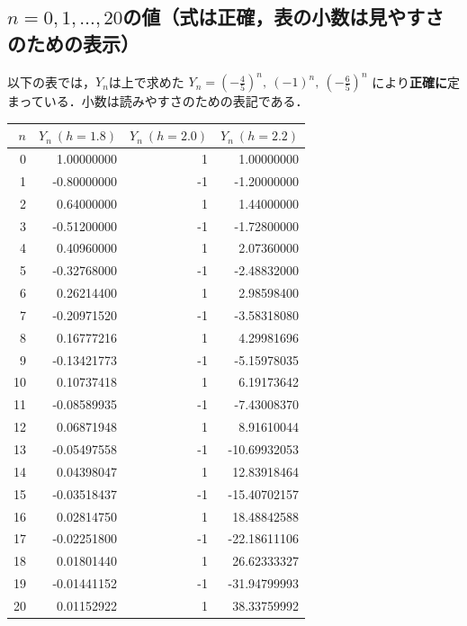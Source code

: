 \documentclass[a4paper,11pt]{jsarticle}
\begin{document}
\subsection{$n=0,1,\dots,20$の値（式は正確，表の小数は見やすさのための表示）}
以下の表では，$Y_n$は上で求めた
\(
Y_n=\left(-\frac45\right)^n,\ (-1)^n,\ \left(-\frac65\right)^n
\)
により\textbf{正確に}定まっている．小数は読みやすさのための表記である．

\begin{center}
\scriptsize
\setlength{\tabcolsep}{4pt}
\begin{tabular}{rrrr}
\toprule
$n$ & $Y_n\ (h=1.8)$ & $Y_n\ (h=2.0)$ & $Y_n\ (h=2.2)$\\
\midrule
0  &  1.00000000 &  1 &  1.00000000\\
1  & -0.80000000 & -1 & -1.20000000\\
2  &  0.64000000 &  1 &  1.44000000\\
3  & -0.51200000 & -1 & -1.72800000\\
4  &  0.40960000 &  1 &  2.07360000\\
5  & -0.32768000 & -1 & -2.48832000\\
6  &  0.26214400 &  1 &  2.98598400\\
7  & -0.20971520 & -1 & -3.58318080\\
8  &  0.16777216 &  1 &  4.29981696\\
9  & -0.13421773 & -1 & -5.15978035\\
10 &  0.10737418 &  1 &  6.19173642\\
11 & -0.08589935 & -1 & -7.43008370\\
12 &  0.06871948 &  1 &  8.91610044\\
13 & -0.05497558 & -1 & -10.69932053\\
14 &  0.04398047 &  1 &  12.83918464\\
15 & -0.03518437 & -1 & -15.40702157\\
16 &  0.02814750 &  1 &  18.48842588\\
17 & -0.02251800 & -1 & -22.18611106\\
18 &  0.01801440 &  1 &  26.62333327\\
19 & -0.01441152 & -1 & -31.94799993\\
20 &  0.01152922 &  1 &  38.33759992\\
\bottomrule
\end{tabular}
\end{center}
\end{document}
